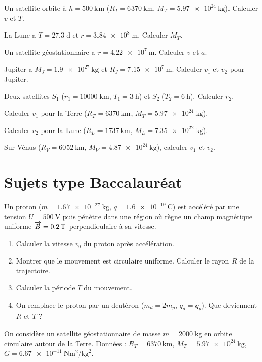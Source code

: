\exo{} Un satellite orbite à $h=\SI{500}{\kilo\metre}$ ($R_T=\SI{6370}{\kilo\metre}$, $M_T=\SI{5.97e24}{\kilogram}$). Calculer $v$ et $T$.

\exo{} La Lune a $T=\SI{27.3}{\day}$ et $r=\SI{3.84e8}{\metre}$. Calculer $M_T$.

\exo{} Un satellite géostationnaire a $r=\SI{4.22e7}{\metre}$. Calculer $v$ et $a$.

\exo{} Jupiter a $M_J=\SI{1.9e27}{\kilogram}$ et $R_J=\SI{7.15e7}{\metre}$. Calculer $v_1$ et $v_2$ pour Jupiter.

\exo{} Deux satellites $S_1$ ($r_1=\SI{10000}{\kilo\metre}$, $T_1=\SI{3}{\hour}$) et $S_2$ ($T_2=\SI{6}{\hour}$). Calculer $r_2$.


\exo{} Calculer $v_1$ pour la Terre ($R_T=\SI{6370}{\kilo\metre}$, $M_T=\SI{5.97e24}{\kilogram}$).

\exo{} Calculer $v_2$ pour la Lune ($R_L=\SI{1737}{\kilo\metre}$, $M_L=\SI{7.35e22}{\kilogram}$).

\exo{} Sur Vénus ($R_V=\SI{6052}{\kilo\metre}$, $M_V=\SI{4.87e24}{\kilogram}$), calculer $v_1$ et $v_2$.

\section{Sujets type Baccalauréat}

Un proton ($m=\SI{1.67e-27}{\kilogram}$, $q=\SI{1.6e-19}{\coulomb}$) est accéléré par une tension $U=\SI{500}{\volt}$ puis pénètre dans une région où règne un champ magnétique uniforme $\overrightarrow{B}=\SI{0.2}{\tesla}$ perpendiculaire à sa vitesse.

\begin{enumerate}[label=\arabic*)]
\item Calculer la vitesse $v_0$ du proton après accélération.
\item Montrer que le mouvement est circulaire uniforme. Calculer le rayon $R$ de la trajectoire.
\item Calculer la période $T$ du mouvement.
\item On remplace le proton par un deutéron ($m_d=2m_p$, $q_d=q_p$). Que deviennent $R$ et $T$ ?
\end{enumerate}

On considère un satellite géostationnaire de masse $m=\SI{2000}{\kilogram}$ en orbite circulaire autour de la Terre. Données : $R_T=\SI{6370}{\kilo\metre}$, $M_T=\SI{5.97e24}{\kilogram}$, $G=\SI{6.67e-11}{\newton\metre\squared\per\kilogram\squared}$.

